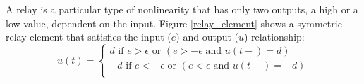 \documentclass[a4paper, 12pt]{article}
\begin{document}
A relay is a particular type of nonlinearity that has only two outputs, a high or a low value, dependent on the input. Figure \ref{relay_element} shows a symmetric relay element that satisfies the input ($e$) and output ($u$) relationship:
\begin{equation}\label{eq:symmetric_relay_equation}
	u(t)=\begin{cases}
	               d \text{ if } e > \epsilon \text{ or } (e >-\epsilon \text{ and } u(t-) = d)\\
	                -d \text{ if } e < -\epsilon \text{ or } (e < \epsilon \text{ and } u(t-) = -d)\\
	              
	            \end{cases}
\end{equation}
\end{document}
